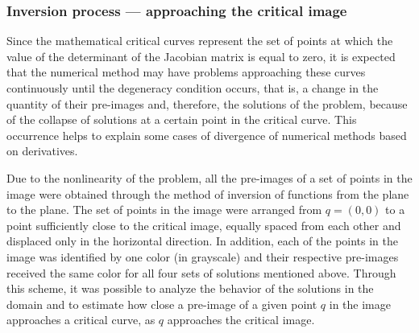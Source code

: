 \documentclass[journal=iecred,manuscript=article]{achemso}
\theoremstyle{definition}
\theoremstyle{remark}
\begin{document}
\subsubsection{Inversion process --- approaching the critical image}

Since the mathematical critical curves represent the set of points at which the value of the determinant of the Jacobian matrix is equal to zero, it is expected that the numerical method may have problems approaching these curves continuously until the degeneracy condition occurs, that is, a change in the quantity of their pre-images and, therefore, the solutions of the problem, because of the collapse of solutions at a certain point in the critical curve. This occurrence helps to explain some cases of divergence of numerical methods based on derivatives.

Due to the nonlinearity of the problem, all the pre-images of a set of points in the image were obtained through the method of inversion of functions from the plane to the plane. The set of points in the image were arranged from $ q = \left(0,0\right) $ to a point sufficiently close to the critical image, equally spaced from each other and displaced only in the horizontal direction. In addition, each of the points in the image was identified by one color (in grayscale) and their respective pre-images received the same color for all four sets of solutions mentioned above. Through this scheme, it was possible to analyze the behavior of the solutions in the domain and to estimate how close a pre-image of a given point $ q $ in the image approaches a critical curve, as $ q $ approaches the critical image.
\end{document}

